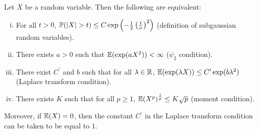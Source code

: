 \documentclass[11pt]{article}
\begin{document}
\begin{lemma}
  Let $X$ be a random variable. Then the following are equivalent:
  \begin{enumerate}[(i)]
  \item For all $t> 0$, $\P(|X| > t) \leq C \exp\left( -\frac{1}{2} \left( \frac{t}{\sigma} \right)^2 \right)$ (definition of subgaussian random variables).
  \item There exists $a > 0$ such that $\E(\exp(aX^2)) < \infty$ ($\psi_2$ condition).
  \item There exist $C^{\prime}$ and $b$ such that for all $\lambda \in \R$, $\E(\exp(\lambda X)) \leq C^{\prime} \exp(b \lambda^2)$ (Laplace transform condition).
  \item There exists $K$ such that for all $p \geq 1$, $\E(X^p)^{\frac{1}{p}} \leq K \sqrt{p}$ (moment condition).
  \end{enumerate}
  Moreover, if $\E(X) = 0$, then the constant $C^{\prime}$ in the Laplace transform condition can be taken to be equal to $1$.
\end{lemma}
\end{document}
